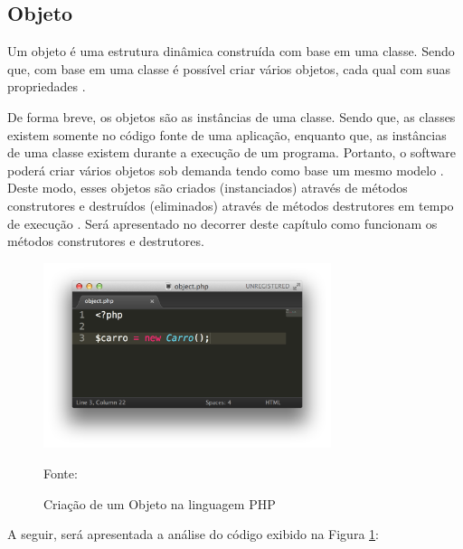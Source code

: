 \subsection{Objeto}

Um objeto é uma estrutura dinâmica construída com base em uma classe. Sendo que,
com base em uma classe é possível criar vários objetos, cada qual com suas
propriedades \cite{phpProgramandoComOrientacaoAObjetos}.

De forma breve, os objetos são as instâncias de uma classe. Sendo que, as
classes existem somente no código fonte de uma aplicação, enquanto que, as
instâncias de uma classe existem durante a execução de um programa. Portanto,
o software poderá criar vários objetos sob demanda tendo como base um mesmo
modelo \cite{ios7ProgrammingFundamentalsObjectiveCXcodeAndCocoaBasics}. Deste
modo, esses objetos são criados (instanciados) através de métodos construtores
e destruídos (eliminados) através de métodos destrutores em tempo de execução
\cite{umlEC++GuiaPraticoDeDesenvolvimentoOrientadoAObjeto}. Será apresentado no
decorrer deste capítulo como funcionam os métodos construtores e destrutores.

\begin{figure}[h!tb]
	\caption{Criação de um Objeto na linguagem PHP}
	\label{fig:objeto}

	\centering
	\includegraphics[width=0.75\textwidth]{images/object.png}

	\centering
	\footnotesize Fonte: \fonteOAutor
\end{figure}

\FloatBarrier 	%

A seguir, será apresentada a análise do código exibido na
Figura \ref{fig:objeto}:

